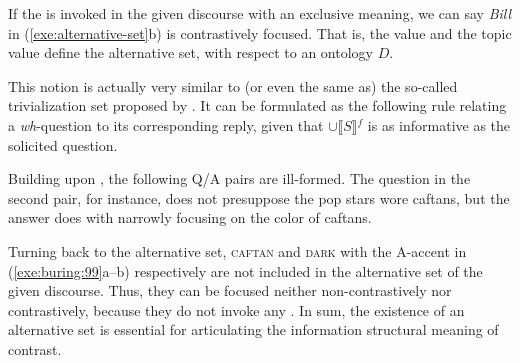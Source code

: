 \noindent If the  is invoked in the given discourse
with an exclusive meaning, we can say \textit{Bill} in
(\ref{exe:alternative-set}b) is 
contrastively focused. That is, the
 value and the topic value define the alternative set, with
respect to an ontology \ensuremath{D}.

This notion is actually very similar to (or even the same as) the
so-called trivialization set proposed by
\citet{buring:99}. It can be formulated as
the following rule relating a \textit{wh}-question to its
corresponding reply, given that \ensuremath{\cup\llbracket S
  \rrbracket}$^{f}$ is as informative as the solicited question.


\noindent Building upon , the following Q/A
pairs are ill-formed. The question in the second pair, for instance,
does not presuppose the pop stars wore caftans, but the answer does
with narrowly focusing on the color of caftans.





\noindent Turning back to the alternative set, \textsc{caftan} and
\textsc{dark} with the A-accent in (\ref{exe:buring:99}a--b)
respectively are not included in the alternative set of the given
discourse. Thus, they can be focused neither
non-contrastively nor contrastively, because they do not invoke any
. In sum, the existence of an alternative set is
essential for articulating the information structural meaning of
contrast.








